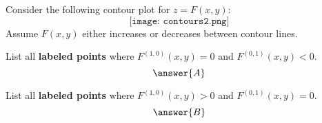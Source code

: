 \documentclass{ximera}
\author{Bart Snapp}
\begin{document}
\begin{exercise}
Consider the following contour plot for $z=F(x,y)$:
\[
\texttt{[image: contours2.png]}
\]
Assume $F(x,y)$ either increases or decreases between contour lines.

List all \textbf{labeled points} where $F^{(1,0)}(x,y) = 0$ and
$F^{(0,1)}(x,y)<0$.
\[
\answer{A}
\]

  
List all \textbf{labeled points} where $F^{(1,0)}(x,y) >0$ and
$F^{(0,1)}(x,y)=0$.
\[
\answer{B}
\]
\end{exercise}
\end{document}
